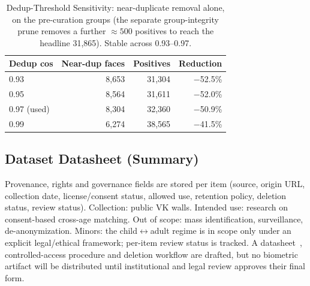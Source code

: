 \documentclass[journal]{IEEEtran}
\begin{document}
\begin{table}[!t]
\renewcommand{\arraystretch}{1.2}
\caption{Dedup-Threshold Sensitivity: near-duplicate removal alone, on the pre-curation groups (the separate group-integrity prune removes a further ${\approx}500$ positives to reach the headline 31{,}865). Stable across 0.93--0.97.}
\label{tab:dedupsens}
\centering
\footnotesize
\begin{tabular}{@{}lrrr@{}}
\toprule
Dedup cos & Near-dup faces & Positives & Reduction \\
\midrule
0.93 & 8{,}653 & 31{,}304 & $-$52.5\% \\
0.95 & 8{,}564 & 31{,}611 & $-$52.0\% \\
0.97 (used) & 8{,}304 & 32{,}360 & $-$50.9\% \\
0.99 & 6{,}274 & 38{,}565 & $-$41.5\% \\
\bottomrule
\end{tabular}
\end{table}

\subsection{Dataset Datasheet (Summary)}\label{sec:data-datasheet}
Provenance, rights and governance fields are stored per item (source, origin URL, collection date, license/consent status, allowed use, retention policy, deletion status, review status). Collection: public VK walls. Intended use: research on consent-based cross-age matching. Out of scope: mass identification, surveillance, de-anonymization. Minors: the child$\leftrightarrow$adult regime is in scope only under an explicit legal/ethical framework; per-item review status is tracked. A datasheet~\cite{gebru2021datasheets}, controlled-access procedure and deletion workflow are drafted, but no biometric artifact will be distributed until institutional and legal review approves their final form.
\end{document}
